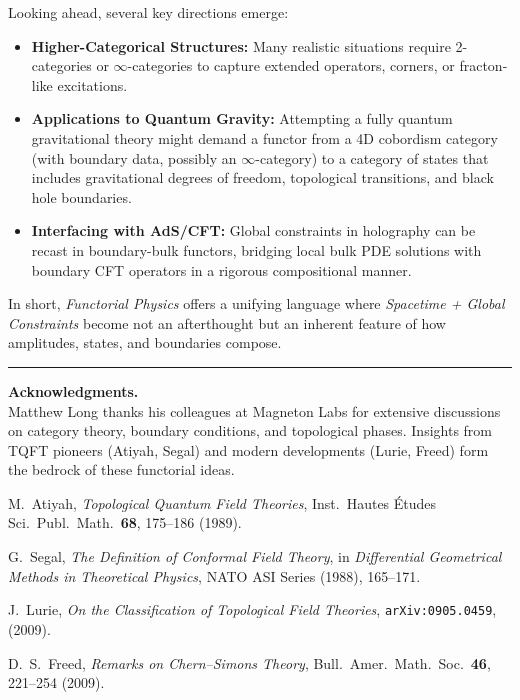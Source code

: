 \documentclass[12pt]{article}
\begin{document}
Looking ahead, several key directions emerge:
\begin{itemize}[label=$\bullet$]
    \item \textbf{Higher-Categorical Structures:} Many realistic situations require 2-categories or $\infty$-categories
    to capture extended operators, corners, or fracton-like excitations.
    \item \textbf{Applications to Quantum Gravity:} Attempting a fully quantum gravitational theory might
    demand a functor from a 4D cobordism category (with boundary data, possibly an $\infty$-category) to a category of
    states that includes gravitational degrees of freedom, topological transitions, and black hole boundaries.
    \item \textbf{Interfacing with AdS/CFT:} Global constraints in holography can be recast in boundary-bulk functors,
    bridging local bulk PDE solutions with boundary CFT operators in a rigorous compositional manner.
\end{itemize}

\noindent In short, \emph{Functorial Physics} offers a unifying language where \emph{Spacetime + Global Constraints} become
not an afterthought but an inherent feature of how amplitudes, states, and boundaries compose.

\vspace{1em}
\hrule
\vspace{1em}

\noindent \textbf{Acknowledgments.} \\
Matthew Long thanks his colleagues at Magneton Labs for extensive discussions on category theory, boundary conditions,
and topological phases. Insights from TQFT pioneers (Atiyah, Segal) and modern developments (Lurie, Freed) form the bedrock
of these functorial ideas.

\vspace{1em}

\begin{thebibliography}{9}

M.\ Atiyah, 
\emph{Topological Quantum Field Theories}, 
Inst.\ Hautes \'Etudes Sci.\ Publ.\ Math.\ \textbf{68}, 175--186 (1989).

G.\ Segal, 
\emph{The Definition of Conformal Field Theory}, 
in \emph{Differential Geometrical Methods in Theoretical Physics},
NATO ASI Series (1988), 165--171.

J.\ Lurie, 
\emph{On the Classification of Topological Field Theories},
\texttt{arXiv:0905.0459}, (2009).

D.\ S.\ Freed, 
\emph{Remarks on Chern--Simons Theory}, 
Bull.\ Amer.\ Math.\ Soc.\ \textbf{46}, 221--254 (2009).

\end{thebibliography}
\end{document}
